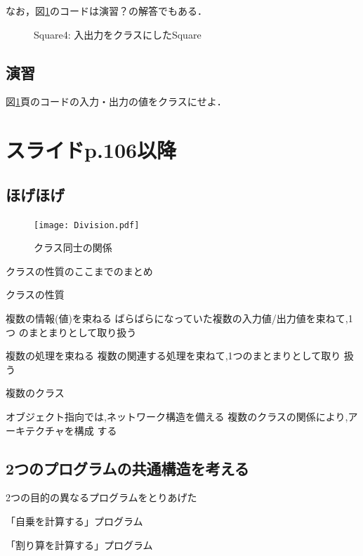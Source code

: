 \documentclass[a4j, twoside]{jsbook}
\begin{document}
なお，図\ref{fig:Square4:Square}のコードは演習？の解答でもある．

\begin{figure}
 
 \caption{Square4: 入出力をクラスにしたSquare}\label{fig:Square4:Square}
\end{figure}


\section{演習}
\begin{演習}
 図\ref{fig:Square4:Square}頁のコードの入力・出力の値をクラスにせよ．
\end{演習}



\chapter{スライドp.106以降}
\section{ほげほげ}

\begin{figure}
 \begin{center}
  \texttt{[image: Division.pdf]}
  \caption{クラス同士の関係}
 \end{center}
\end{figure}

クラスの性質のここまでのまとめ

クラスの性質

 複数の情報(値)を束ねる
 ばらばらになっていた複数の入力値/出力値を束ねて,1つ
のまとまりとして取り扱う

 複数の処理を束ねる
 複数の関連する処理を束ねて,1つのまとまりとして取り
扱う

複数のクラス

 オブジェクト指向では,ネットワーク構造を備える
複数のクラスの関係により,アーキテクチャを構成
する

\section{2つのプログラムの共通構造を考える}
2つの目的の異なるプログラムをとりあげた

 「自乗を計算する」プログラム

 「割り算を計算する」プログラム
\end{document}
